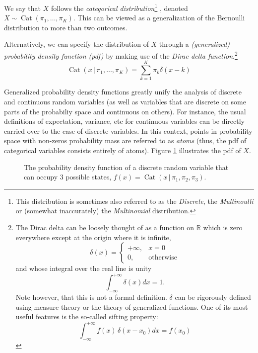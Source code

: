 \documentclass[final,3p,times,twocolumn]{elsarticle}
\DeclareMathOperator*{\Cat}{Cat}
\begin{document}
We say that $X$ follows the \emph{categorical distribution}\footnote{This distribution is sometimes also referred to as the \emph{Discrete}, the \emph{Multinoulli} or (somewhat inaccurately) the \emph{Multinomial} distribution.}
, denoted $X \sim \Cat(\pi_1, \dots, \pi_K)$.
This can be viewed as a generalization of the Bernoulli distribution to more than two outcomes.

Alternatively, we can specify the distribution of $X$ through a \emph{(generalized) probability density function (pdf)} by making use of the \emph{Dirac delta function}.\footnote{The Dirac delta can be loosely thought of as a function on $\mathbb{R}$ which is zero everywhere except at the origin where it is infinite,
\[\delta(x) = \left\{
\begin{array}{ll}
+\infty, & x = 0\\
0, & \mbox{otherwise}
\end{array} \right.\]
and whose integral over the real line is unity
\[ \int_{-\infty}^{+\infty}\delta(x)dx = 1.\]
Note however, that this is not a formal definition. $\delta$ can be rigorously defined using measure theory or the theory of generalized functions.
One of its most useful features is the so-called sifting property: 
\[ \int_{-\infty}^{+\infty} f(x)\,\delta(x - x_0)dx = f(x_0)\]}
\begin{equation}
\label{eqn:catpdf}
\Cat(x\,|\,\pi_1,\dots,\pi_K) = \sum_{k=1}^K \pi_k \delta(x - k)
\end{equation}

Generalized probability density functions greatly unify the analysis of discrete and continuous random variables (as well as variables that are discrete on some parts of the probabiliy space and continuous on others).
For instance, the usual definitions of expectation, variance, etc for continuous variables can be directly carried over to the case of discrete variables.
In this context, points in probability space with non-zeros probability mass are referred to as \emph{atoms} (thus, the pdf of categorical variables consists entirely of atoms).
Figure \ref{fig:pmf} illustrates the pdf of $X$.

\begin{figure}
\caption{The probability density function of a discrete random variable that can occupy 3 possible states, $f(x) = \Cat(x\,|\,\pi_1,\pi_2,\pi_3)$.}
\label{fig:pmf}
\end{figure}
\end{document}
